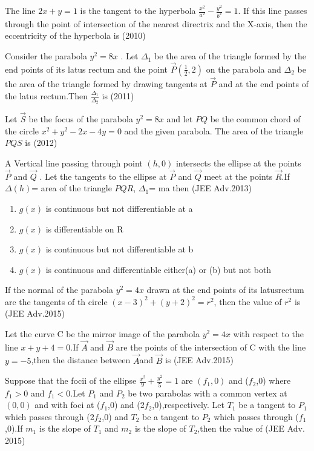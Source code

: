 \iffalse
  \title{conic-sections}
  \author{KOTHAPALLI AKHIL}
  \section{integer}
\fi
\item The line $2x+y=1$ is the tangent to the hyperbola $\frac{x^2}{a^2}-\frac{y^2}{b^2}=1$. If this line passes through the point of intersection of the nearest directrix and the X-axis, then the eccentricity of the hyperbola is
\hfill(2010)
\item Consider the parabola $y^2=8x$ . Let $\Delta_1$ be the area of the triangle formed by the end points of its latus rectum and the point $\Vec{P}$$(\frac{1}{2},2)$ on the parabola and $\Delta_2$ be the area of the triangle formed by drawing tangents at $\Vec{P}$ and at the end points of the latus rectum.Then $\frac{\Delta_1}{\Delta_2}$ is 
\hfill(2011)
\item Let $\Vec{S}$ be the focus of the parabola $y^2=8x$ and let $PQ$ be the common chord of the circle $x^2+y^2-2x-4y=0$ and the given parabola. The area of the triangle $PQS$ is
\hfill(2012)
\item A Vertical line passing through point $(h,0)$ intersects the ellipse   at the points  $\Vec{P}$ and $\Vec{Q}$ . Let the tangents to the ellipse at $\Vec{P}$ and $\Vec{Q}$ meet at the points $\Vec{R}$.If $\Delta(h)$= area of the triangle $PQR$, $\Delta_1$= ma
then 
\hfill(JEE Adv.2013)
\begin{enumerate}
    \item $g(x)$ is continuous but not differentiable at a
    \item $g(x)$ is differentiable on R
    \item $g(x)$ is continuous but not differentiable at b
    \item $g(x)$ is continuous and differentiable either(a) or (b) but not both 
    \end{enumerate}
\item If the normal of the parabola $y^2=4x$ drawn at the end points of its latusrectum are the tangents of th circle $(x-3)^2+(y+2)^2=r^2$, then the value of $r^2$ is
\hfill(JEE Adv.2015)
\item Let the curve C be the mirror image of the parabola $y^2=4x$ with respect to the line $x+y+4=0$.If $\Vec{A}$ and $\Vec{B}$ are the points of the intersection of C with the line $y=-5$,then the distance between $\Vec{A}$and $\Vec{B}$ is
\hfill(JEE Adv.2015)
\item Suppose that the focii of the ellipse $\frac{x^2}{9}+\frac{y^2}{5}=1$ are $(f_1,0)$ and ($f_2$,0) where $f_1>0$ and $f_1<0$.Let $P_1$ and $P_2$ be two parabolas with a common vertex at $(0,0)$ and with foci at ($f_1$,0) and (2$f_2$,0),respectively. Let $T_1$ be a tangent to $P_1$ which passes through (2$f_2$,0) and $T_2$ be a tangent to $P_2$ which passes through ($f_1$,0).If $m_1$ is the slope of $T_1$ and $m_2$ is the slope of $T_2$,then the value of
\hfill(JEE Adv. 2015)

% 
